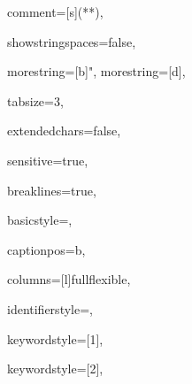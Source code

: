 {%

comment=[s]{(*}{*)},

showstringspaces=false,

morestring=[b]",
morestring=[d],

tabsize=3,							

extendedchars=false,

sensitive=true, 

breaklines=true,

basicstyle=\ttfamily,

captionpos=b,							

columns=[l]fullflexible,

identifierstyle={\ttfamily\color{black}},

keywordstyle=[1]{\ttfamily\color{dkviolet}},

keywordstyle=[2]{\ttfamily\color{dkgreen}},

}
